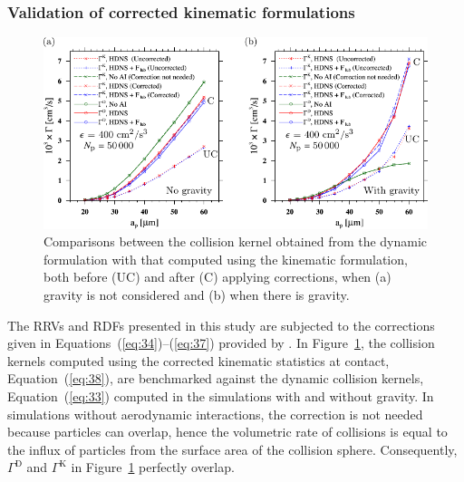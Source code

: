 \documentclass[../thesis.tex]{subfiles}
\begin{document}
\subsubsection{Validation of corrected kinematic formulations}

\begin{figure}%
\center
\includegraphics[width=\textwidth]{../figs/JFM/fig16.pdf}
\caption{Comparisons between the collision kernel obtained from the dynamic formulation with that computed using the kinematic formulation, both before (UC) and after (C) applying corrections, when (a) gravity is not considered and (b) when there is gravity.}
\label{Fig16}
\end{figure}%

The RRVs and RDFs presented in this study are subjected to the corrections given in Equations~(\ref{eq:34})--(\ref{eq:37}) provided by \cite{WAKG05}. In Figure~\ref{Fig16}, the collision kernels computed using the corrected kinematic statistics at contact, Equation~(\ref{eq:38}), are benchmarked against the dynamic collision kernels, Equation~(\ref{eq:33}) computed in the simulations with and without gravity. In simulations without aerodynamic interactions, the correction is not needed because particles can overlap, hence the volumetric rate of collisions is equal to the influx of particles from the surface area of the collision sphere. Consequently, $\Gamma^\text{D}$ and $\Gamma^\text{K}$ in Figure~\ref{Fig16} perfectly overlap.
\end{document}
